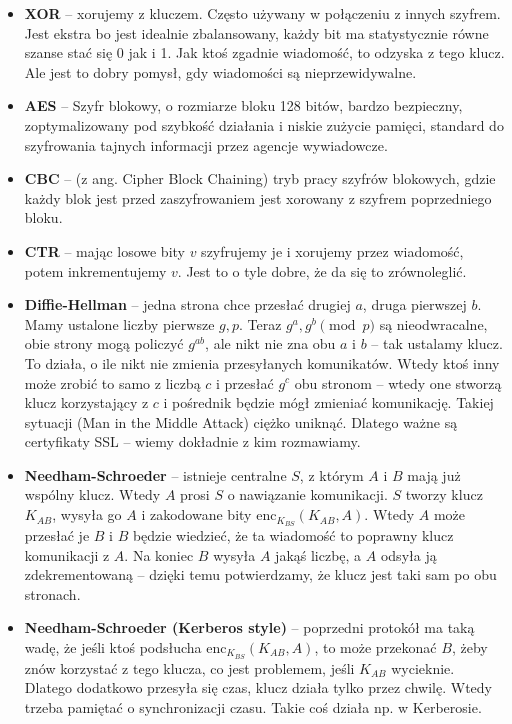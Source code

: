 \begin{itemize}
	\item \textbf{XOR} -- xorujemy z kluczem. Często używany w połączeniu z innych szyfrem. Jest ekstra bo jest idealnie zbalansowany, każdy bit ma statystycznie równe szanse stać się 0 jak i 1. Jak ktoś zgadnie wiadomość, to odzyska z tego klucz. Ale jest to dobry pomysł, gdy wiadomości są nieprzewidywalne.
	\item \textbf{AES} -- Szyfr blokowy, o rozmiarze bloku 128 bitów, bardzo bezpieczny, zoptymalizowany pod szybkość działania i niskie zużycie pamięci, standard do szyfrowania tajnych informacji przez agencje wywiadowcze.
	\item \textbf{CBC} -- (z ang. Cipher Block Chaining) tryb pracy szyfrów blokowych, gdzie każdy blok jest przed zaszyfrowaniem jest xorowany z szyfrem poprzedniego bloku.
	\item \textbf{CTR} --  mając losowe bity \(v\) szyfrujemy je i xorujemy przez wiadomość, potem inkrementujemy \(v\). Jest to o tyle dobre, że da się to zrównoleglić.
	\item \textbf{Diffie-Hellman} -- jedna strona chce przesłać drugiej \(a\), druga pierwszej \(b\). Mamy ustalone liczby pierwsze \(g, p \). Teraz \(g^{a}, g^{b} \pmod p\) są nieodwracalne, obie strony mogą policzyć \(g^{ab}\), ale nikt nie zna obu \(a\) i \(b\) -- tak ustalamy klucz. To działa, o ile nikt nie zmienia przesyłanych komunikatów. Wtedy ktoś inny może zrobić to samo z liczbą \(c\) i przesłać \(g^{c}\) obu stronom -- wtedy one stworzą klucz korzystający z \(c\) i pośrednik będzie mógł zmieniać komunikację. Takiej sytuacji (Man in the Middle Attack) ciężko uniknąć. Dlatego ważne są certyfikaty SSL -- wiemy dokładnie z kim rozmawiamy.
	\item \textbf{Needham-Schroeder} -- istnieje centralne \(S\), z którym \(A\) i \(B\) mają już wspólny klucz. Wtedy \(A\) prosi \(S\) o nawiązanie komunikacji. \(S\) tworzy klucz \(K_{AB}\), wysyła go \(A\) i zakodowane bity \(\mathrm{enc}_{K_{BS}}\left( K_{AB}, A \right) \). Wtedy \(A\) może przesłać je \(B\) i \(B\) będzie wiedzieć, że ta wiadomość to poprawny klucz komunikacji z \(A\). Na koniec \(B\) wysyła \(A\) jakąś liczbę, a \(A\) odsyła ją zdekrementowaną -- dzięki temu potwierdzamy, że klucz jest taki sam po obu stronach.
	\item \textbf{Needham-Schroeder (Kerberos style)} -- poprzedni protokół ma taką wadę, że jeśli ktoś podsłucha \(\mathrm{enc}_{K_{BS}}\left( K_{AB},A \right) \), to może przekonać \(B\), żeby znów korzystać z tego klucza, co jest problemem, jeśli \(K_{AB}\) wycieknie. Dlatego dodatkowo przesyła się czas, klucz działa tylko przez chwilę. Wtedy trzeba pamiętać o synchronizacji czasu. Takie coś działa np. w Kerberosie.
\end{itemize}

